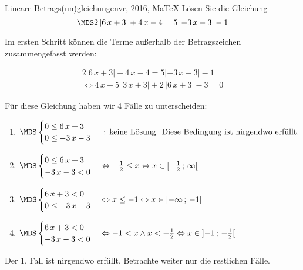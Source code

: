  \providecommand{\MoIl}[1][]{\mbox{}#1]\mathopen{}} 
 \providecommand{\MoIr}[1][]{#1[\mbox{}} 
 \providecommand{\MIntvlSep}{;} 
 \providecommand{\MElSetSep}{\, ; \, } 
 \begin{MAufgabe}{Lineare Betrags(un)gleichungen}{vr, 2016, MaTeX}
L\"osen Sie die Gleichung
$$
 \MDS 2\left| 6\, x + 3 \right|+4\, x - 4= 5 \left|  - 3\, x - 3 \right| -1
$$  

\ifLsg\MLoesung

Im ersten Schritt k\"onnen die Terme au\ss{}erhalb der Betragszeichen zusammengefasst werden:

\begin{align*} 
 2\left| 6\, x + 3 \right|+4\, x - 4= 5 \left|  - 3\, x - 3 \right| -1\\ 
\Leftrightarrow4\, x - 5\, \left|3\, x + 3\right| + 2\, \left|6\, x + 3\right| - 3= 0 
 \end{align*}

F\"ur diese Gleichung haben wir 4 F\"alle zu unterscheiden: 
\begin{enumerate}
\item $ \MDS 
\begin{cases} 
 0 \leq 6\, x + 3\\ 
0 \leq  - 3\, x - 3
 \end{cases}
 \mbox{ : keine L\"osung. Diese Bedingung ist nirgendwo erf\"ullt.}$ 
\item $ \MDS 
\begin{cases} 
 0 \leq 6\, x + 3\\ 
 - 3\, x - 3 < 0
 \end{cases}
\Leftrightarrow - \frac{1}{2} \leq x\Leftrightarrow x \in [ - \frac{1}{2} \, \MIntvlSep \, \infty\MoIr $ 
\item $ \MDS 
\begin{cases} 
 6\, x + 3 < 0\\ 
0 \leq  - 3\, x - 3
 \end{cases}
\Leftrightarrow x \leq -1\Leftrightarrow x \in \MoIl  -\infty \, \MIntvlSep \, -1]$ 
\item $ \MDS 
\begin{cases} 
 6\, x + 3 < 0\\ 
 - 3\, x - 3 < 0
 \end{cases}
\Leftrightarrow -1 < x \wedge x < - \frac{1}{2}\Leftrightarrow x \in \MoIl  -1 \, \MIntvlSep \, - \frac{1}{2}\MoIr $ 
\end{enumerate} 
Der 1. Fall ist nirgendwo erf\"ullt. Betrachte weiter nur die restlichen F\"alle.
 

\end{MAufgabe}
